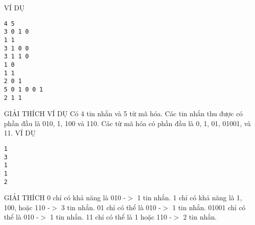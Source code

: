 VÍ DỤ
\begin{verbatim}
4 5
3 0 1 0
1 1
3 1 0 0
3 1 1 0
1 0
1 1
2 0 1
5 0 1 0 0 1
2 1 1
\end{verbatim}
GIẢI THÍCH VÍ DỤ
Có 4 tin nhắn và 5 từ mã hóa. Các tin nhắn thu được có phần đầu là 010, 1, 100 và 110. Các từ mã hóa có phần đầu là 0, 1, 01, 01001, và 11.
VÍ DỤ
\begin{verbatim}
1
3
1
1
2
\end{verbatim}
GIẢI THÍCH
0 chỉ có khả năng là 010 -$>$ 1 tin nhắn. 1 chỉ có khả năng là 1, 100, hoặc 110 -$>$ 3 tin nhắn. 01 chỉ có thể là 010 -$>$ 1 tin nhắn. 01001 chỉ có thể là 010 -$>$ 1 tin nhắn. 11 chỉ có thể là 1 hoặc 110 -$>$ 2 tin nhắn.